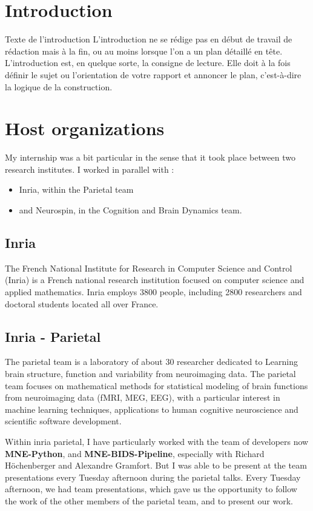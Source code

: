 \chapter*{Introduction}

Texte de l'introduction
L’introduction ne se rédige pas en début de travail de rédaction mais à la fin, ou au moins lorsque l’on a un plan détaillé en tête.
L’introduction est, en quelque sorte, la consigne de lecture. Elle doit à la fois définir le sujet ou l’orientation de votre rapport et annoncer le plan, c’est-à-dire la logique de la construction.


\chapter*{Host organizations}

My internship was a bit particular in the sense that it took place between two research institutes. I worked in parallel with :
\begin{itemize}
    \item Inria, within the Parietal team
    \item and Neurospin, in the Cognition and Brain Dynamics team.
\end{itemize} 

\section*{Inria}

The French National Institute for Research in Computer Science and Control (Inria) is a French national research institution focused on computer science and applied mathematics. Inria employs 3800 people, including 2800 researchers and doctoral students located all over France.

\section*{Inria - Parietal}

The parietal team is a laboratory of about 30 researcher dedicated to Learning brain structure, function and variability from neuroimaging data. The parietal team focuses on mathematical methods for statistical modeling of brain functions from neuroimaging data (fMRI, MEG, EEG), with a particular interest in machine learning techniques, applications to human cognitive neuroscience and scientific software development.

Within inria parietal, I have particularly worked with the team of developers now \textbf{MNE-Python}, and \textbf{MNE-BIDS-Pipeline}, especially with Richard Höchenberger and Alexandre Gramfort. But I was able to be present at the team presentations every Tuesday afternoon during the parietal talks. Every Tuesday afternoon, we had team presentations, which gave us the opportunity to follow the work of the other members of the parietal team, and to present our work.

